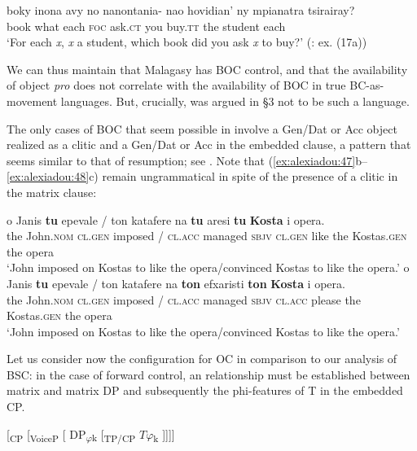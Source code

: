 \documentclass[output=paper]{langsci/langscibook}
\begin{document}
\ea%
    \label{ex:alexiadou:49}
    \gll boky inona avy no nanontania- nao hovidian’ ny mpianatra tsirairay?\\
         book what each \textsc{foc}  ask.\textsc{ct}  you buy.\textsc{tt} the student each\\
    \glt ‘For each \textit{x}, \textit{x} a student, which book did you ask \textit{x} to buy?’ (\citealt{Potsdam2006Backward}: ex. (17a))
    \z

We can thus maintain that Malagasy has BOC control, and that the availability of object \textit{pro} does not correlate with the availability of BOC in true BC-as-movement languages. But, crucially,  was argued in §3 not to be such a language.

The only cases of BOC that seem possible in  involve a Gen\slash Dat or Acc object realized as a clitic and a Gen\slash Dat or Acc  in the embedded clause, a pattern that seems similar to that of resumption; see . Note that (\ref{ex:alexiadou:47}b--\ref{ex:alexiadou:48}c) remain ungrammatical in spite of the presence of a clitic in the matrix clause:\largerpage

\ea%
    \label{ex:alexiadou:50}
    \ea
    \gll o    Janis    \textbf{tu}  epevale / ton katafere   na   \textbf{tu} aresi  \textbf{tu}  \textbf{Kosta}          i opera.\\
                   the John.\textsc{nom}   \textsc{cl.gen}  imposed / \textsc{cl.acc} managed  \textsc{sbjv} \textsc{cl.gen}  like   the Kostas.\textsc{gen} the opera\\
    \glt           ‘John imposed on Kostas to like the opera\slash convinced Kostas to like the opera.’
    \ex
    \gll o    Janis    \textbf{tu}  epevale / ton katafere   na   \textbf{ton} efxaristi  \textbf{ton}  \textbf{Kosta}         i opera.\\
           the John.\textsc{nom} \textsc{cl.gen}  imposed / \textsc{cl.acc} managed  \textsc{sbjv} \textsc{cl.acc}  please the Kostas.\textsc{gen} the opera\\
    \glt   ‘John imposed on Kostas to like the opera\slash convinced Kostas to like the opera.’
    \z
\z

Let us consider now the configuration for OC in comparison to our analysis of BSC: in the case of forward control, an  relationship must be established between matrix  and matrix DP and subsequently the phi-features of T in the embedded CP.    

\ea%
    \label{ex:alexiadou:51}
    [\textsubscript{CP} [\textsubscript{VoiceP} [ DP\textsubscript{$\varphi $}\textsubscript{k} [\textsubscript{TP/CP}    $T\varphi $\textsubscript{k}    ]]]]
    \z
\end{document}

